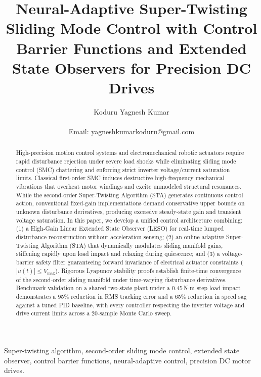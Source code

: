 \documentclass[journal,twocolumn,letterpaper]{IEEEtran}
\begin{document}
\title{Neural-Adaptive Super-Twisting Sliding Mode Control with Control Barrier Functions and Extended State Observers for Precision DC Drives}

\author{Koduru Yagnesh Kumar\\
\\
Email: yagneshkumarkoduru@gmail.com}

\maketitle

\begin{abstract}
High-precision motion control systems and electromechanical robotic actuators require rapid disturbance rejection under severe load shocks while eliminating sliding mode control (SMC) chattering and enforcing strict inverter voltage/current saturation limits. Classical first-order SMC induces destructive high-frequency mechanical vibrations that overheat motor windings and excite unmodeled structural resonances. While the second-order Super-Twisting Algorithm (STA) generates continuous control action, conventional fixed-gain implementations demand conservative upper bounds on unknown disturbance derivatives, producing excessive steady-state gain and transient voltage saturation. In this paper, we develop a unified control architecture combining: (1) a High-Gain Linear Extended State Observer (LESO) for real-time lumped disturbance reconstruction without acceleration sensing; (2) an online adaptive Super-Twisting Algorithm (STA) that dynamically modulates sliding manifold gains, stiffening rapidly upon load impact and relaxing during quiescence; and (3) a voltage-barrier safety filter guaranteeing forward invariance of electrical actuator constraints ($|u(t)| \le V_{\max}$). Rigorous Lyapunov stability proofs establish finite-time convergence of the second-order sliding manifold under time-varying disturbance derivatives. Benchmark validation on a shared two-state plant under a 0.45\,N$\cdot$m step load impact demonstrates a 95\% reduction in RMS tracking error and a 65\% reduction in speed sag against a tuned PID baseline, with every controller respecting the inverter voltage and drive current limits across a 20-sample Monte Carlo sweep.
\end{abstract}

\begin{IEEEkeywords}
Super-twisting algorithm, second-order sliding mode control, extended state observer, control barrier functions, neural-adaptive control, precision DC motor drives.
\end{IEEEkeywords}
\end{document}
